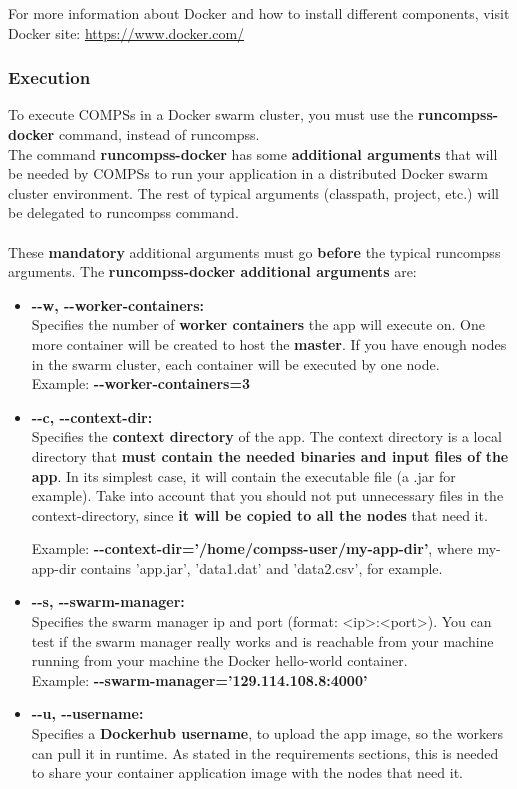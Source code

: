 For more information about Docker and how to install different components, visit Docker site: \url{https://www.docker.com/}

\subsubsection{Execution}
To execute COMPSs in a Docker swarm cluster, you must use the \textbf{runcompss-docker} command, instead of runcompss.
\\
The command \textbf{runcompss-docker} has some \textbf{additional arguments} that will be needed by COMPSs to run your application 
in a distributed Docker swarm cluster environment.
The rest of typical arguments (classpath, project, etc.) will be delegated to runcompss command.
\\ \\
These \textbf{mandatory} additional arguments must go \textbf{before} the typical runcompss arguments. 
The \textbf{runcompss-docker additional arguments} are:
\begin{itemize}
 \item { 
 \textbf{-{}-w, -{}-worker-containers:} \\  
 Specifies the number of \textbf{worker containers} the app will execute on. One more container will be created to host the \textbf{master}. 
 If you have enough nodes in the swarm cluster, each container will be executed by one node.\\
 Example:  \textbf{-{}-worker-containers=3}
 }
 
 \item { 
 \textbf{-{}-c, -{}-context-dir:} \\
 Specifies the \textbf{context directory} of the app. 
 The context directory is a local directory that \textbf{must contain the needed binaries and input files of the app}.
 In its simplest case, it will contain the executable file (a .jar for example).
 Take into account that you should not put unnecessary files in the context-directory, 
 since \textbf{it will be copied to all the nodes} that need it.
 
 Example: \textbf{-{}-context-dir='/home/compss-user/my-app-dir'}, where my-app-dir contains 'app.jar', 'data1.dat' and 'data2.csv', for example.
 }

 \item { 
 \textbf{-{}-s, -{}-swarm-manager:} \\
 Specifies the swarm manager ip and port (format: <ip>:<port>). 
 You can test if the swarm manager really works and is reachable from your machine
 running from your machine the Docker hello-world container.\\
 Example: \textbf{-{}-swarm-manager='129.114.108.8:4000'}
 }
 
 \item { 
 \textbf{-{}-u, -{}-username:} \\
 Specifies a \textbf{Dockerhub username}, to upload the app image, so the workers can pull it in runtime. 
 As stated in the requirements sections, this is needed to share your container application image with the nodes that need it.
 }
\end{itemize}

